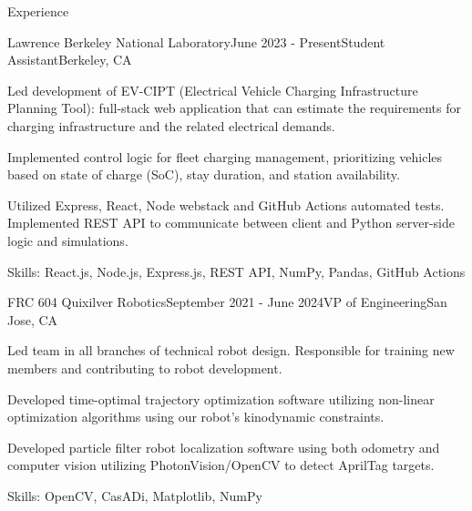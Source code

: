 \documentclass[
	10pt, %
]{tex/resume} %
\begin{document}
\begin{rSection}{Experience}

	\begin{rSubsection}{Lawrence Berkeley National Laboratory}{June 2023 - Present}{Student Assistant}{Berkeley, CA}
		\item Led development of EV-CIPT (Electrical Vehicle Charging Infrastructure Planning Tool): full-stack web application that can estimate the requirements for charging infrastructure and the related electrical demands.
        \item Implemented control logic for fleet charging management, prioritizing vehicles based on state of charge (SoC), stay duration, and station availability.
        \item Utilized Express, React, Node webstack and GitHub Actions automated tests. Implemented REST API to communicate between client and Python server-side logic and simulations.
        \item Skills: React.js, Node.js, Express.js, REST API, NumPy, Pandas, GitHub Actions
        
	\end{rSubsection}


	\begin{rSubsection}{FRC 604 Quixilver Robotics}{September 2021 - June 2024}{VP of Engineering}{San Jose, CA}
		\item Led team in all branches of technical robot design. Responsible for training new members and contributing to robot development.
        \item Developed time-optimal trajectory optimization software utilizing non-linear optimization algorithms using our robot’s kinodynamic constraints.
        \item Developed particle filter robot localization software using both odometry and computer vision utilizing PhotonVision/OpenCV to detect AprilTag targets.
        \item Skills: OpenCV, CasADi, Matplotlib, NumPy
        
	\end{rSubsection}





\end{rSection}

\end{document}
